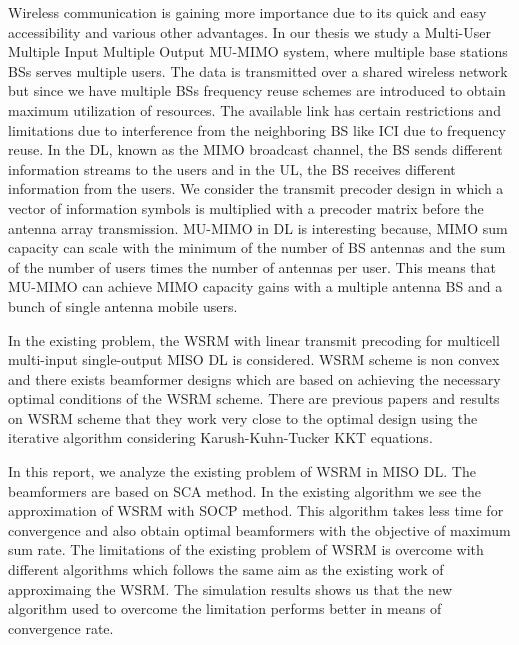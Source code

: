 \documentclass[a4paper, 12pt,titlepage]{dithesis} %
\begin{document}
Wireless communication is gaining more importance due to its quick and easy accessibility and various other advantages. In our thesis we study a Multi-User Multiple Input Multiple Output \ac{MU-MIMO} system, where multiple base stations \ac{BS}s serves multiple users. The data is transmitted over a shared wireless network but since we have multiple \ac{BS}s frequency reuse schemes are introduced to obtain maximum utilization of resources. The available link has certain restrictions and limitations due to interference from the neighboring \ac{BS} like \ac{ICI} due to frequency reuse. In the \ac{DL}, known as the \ac{MIMO} broadcast channel, the \ac{BS} sends different information streams to the users and in the \ac{UL}, the \ac{BS} receives different information from the users. We consider the transmit precoder design in which a vector of information symbols is multiplied with a precoder matrix before the antenna array transmission. \ac{MU-MIMO} in \ac{DL} is interesting because, \ac{MIMO} sum capacity can scale with the minimum of the number of \ac{BS} antennas and the sum of the number of users times the number of antennas per user. This means that \ac{MU-MIMO} can achieve \ac{MIMO} capacity gains with a multiple antenna \ac{BS} and a bunch of single antenna mobile users.

In the existing problem, the \ac{WSRM} with linear transmit precoding for multicell multi-input single-output \ac{MISO} \ac{DL} is considered. \ac{WSRM} scheme is non convex and there exists beamformer designs which are based on achieving the necessary optimal conditions of the \ac{WSRM} scheme. There are previous papers and results on \ac{WSRM} scheme that they work very close to the optimal design using the iterative algorithm considering Karush-Kuhn-Tucker \ac{KKT} equations. 

In this report, we analyze the existing problem of \ac{WSRM} in \ac{MISO} \ac{DL}. The beamformers are based on \ac{SCA} method. In the existing algorithm we see the approximation of \ac{WSRM} with \ac{SOCP} method. This algorithm takes less time for convergence and also obtain optimal beamformers with the objective of maximum sum rate. The limitations of the existing problem of \ac{WSRM} is overcome with different algorithms which follows the same aim as the existing work of approximaing the \ac{WSRM}. The simulation results shows us that the new algorithm used to overcome the limitation performs better in means of convergence rate.

\newpage

 
\end{document}
